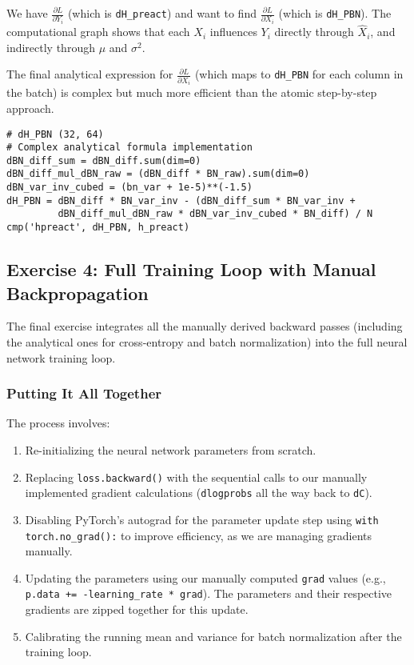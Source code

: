 We have $\frac{\partial L}{\partial Y_i}$ (which is \texttt{dH\_preact}) and want to find $\frac{\partial L}{\partial X_i}$ (which is \texttt{dH\_PBN}).
The computational graph shows that each $X_i$ influences $Y_i$ directly through $\hat{X}_i$, and indirectly through $\mu$ and $\sigma^2$.

The final analytical expression for $\frac{\partial L}{\partial X_i}$ (which maps to \texttt{dH\_PBN} for each column in the batch) is complex but much more efficient than the atomic step-by-step approach.

\begin{lstlisting}[caption={Analytical dH\_PBN for Batch Normalization}]
# dH_PBN (32, 64)
# Complex analytical formula implementation
dBN_diff_sum = dBN_diff.sum(dim=0)
dBN_diff_mul_dBN_raw = (dBN_diff * BN_raw).sum(dim=0)
dBN_var_inv_cubed = (bn_var + 1e-5)**(-1.5)
dH_PBN = dBN_diff * BN_var_inv - (dBN_diff_sum * BN_var_inv + 
         dBN_diff_mul_dBN_raw * dBN_var_inv_cubed * BN_diff) / N
cmp('hpreact', dH_PBN, h_preact)
\end{lstlisting}

\subsection{Exercise 4: Full Training Loop with Manual Backpropagation}

The final exercise integrates all the manually derived backward passes (including the analytical ones for cross-entropy and batch normalization) into the full neural network training loop.

\subsubsection{Putting It All Together}
The process involves:
\begin{enumerate}
    \item Re-initializing the neural network parameters from scratch.
    \item Replacing \texttt{loss.backward()} with the sequential calls to our manually implemented gradient calculations (\texttt{dlogprobs} all the way back to \texttt{dC}).
    \item Disabling PyTorch's autograd for the parameter update step using \texttt{with torch.no\_grad():} to improve efficiency, as we are managing gradients manually.
    \item Updating the parameters using our manually computed \texttt{grad} values (e.g., \texttt{p.data += -learning\_rate * grad}). The parameters and their respective gradients are zipped together for this update.
    \item Calibrating the running mean and variance for batch normalization after the training loop.
\end{enumerate}

